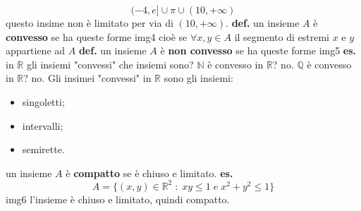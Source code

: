\[
    (-4,e] \cup {\pi} \cup (10, +\infty)
\]
questo insime non è limitato per via di $(10, +\infty)$.
\newline
\textbf{def.} un insieme $A$ è \textbf{convesso} se ha queste forme
\newline
img4
\newline
cioè se $\forall x, y \in A$ il segmento di estremi $x$ e $y$ appartiene ad $A$
\newline
\textbf{def.} un insieme $A$ è \textbf{non convesso} se ha queste forme
\newline
img5
\newline
\newline
\textbf{es.} in $\mathbb{R}$ gli insiemi "convessi" che insiemi sono?
\newline $\mathbb{N}$ è convesso in $\mathbb{R}$? no.
\newline $\mathbb{Q}$ è convesso in $\mathbb{R}$? no.
\newline
Gli insimei "convessi" in $\mathbb{R}$ sono gli insiemi:
\begin{itemize}
    \item singoletti;
    \item intervalli;
    \item semirette.
\end{itemize}
un insieme $A$ è \textbf{compatto} se è chiuso e limitato.
\newline
\textbf{es.} 
\[
    A =\{ (x,y) \in \mathbb{R}^2 \;:\; xy \leq1 \;e\; x^2+y^2 \leq 1 \}
\]
img6
\newline
l'insieme è chiuso e limitato, quindi compatto.
\newline
\newline
\newline
